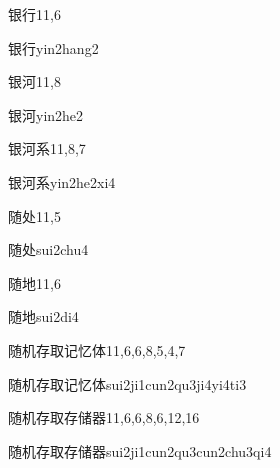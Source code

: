 \begin{entry}{银行}{11,6}
  \begin{phonetics}{银行}{yin2hang2}
  \end{phonetics}
\end{entry}

\begin{entry}{银河}{11,8}
  \begin{phonetics}{银河}{yin2he2}
  \end{phonetics}
\end{entry}

\begin{entry}{银河系}{11,8,7}
  \begin{phonetics}{银河系}{yin2he2xi4}
  \end{phonetics}
\end{entry}

\begin{entry}{随处}{11,5}
  \begin{phonetics}{随处}{sui2chu4}
  \end{phonetics}
\end{entry}

\begin{entry}{随地}{11,6}
  \begin{phonetics}{随地}{sui2di4}
  \end{phonetics}
\end{entry}

\begin{entry}{随机存取记忆体}{11,6,6,8,5,4,7}
  \begin{phonetics}{随机存取记忆体}{sui2ji1cun2qu3ji4yi4ti3}
  \end{phonetics}
\end{entry}

\begin{entry}{随机存取存储器}{11,6,6,8,6,12,16}
  \begin{phonetics}{随机存取存储器}{sui2ji1cun2qu3cun2chu3qi4}
  \end{phonetics}
\end{entry}

